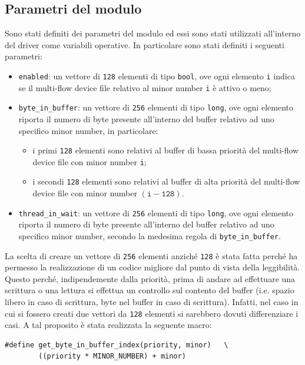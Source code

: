 \documentclass[oneside]{article}
\begin{document}
\subsection{Parametri del modulo}
Sono stati definiti dei parametri del modulo ed essi sono stati utilizzati all'interno del driver come variabili operative. In particolare sono stati definiti i seguenti parametri:
\begin{itemize}
\item \texttt{enabled}: un vettore di \texttt{128} elementi di tipo \texttt{bool}, ove ogni elemento \texttt{i} indica se il multi-flow device file relativo al minor number \texttt{i} è attivo o meno;
\item \texttt{byte\_in\_buffer}: un vettore di \texttt{256} elementi di tipo \texttt{long}, ove ogni elemento riporta il numero di byte presente all'interno del buffer relativo ad uno specifico minor number, in particolare:
\begin{itemize}
\item i primi \texttt{128} elementi sono relativi al buffer di bassa priorità del multi-flow device file con minor number \texttt{i};
\item i secondi \texttt{128} elementi sono relativi al buffer di alta priorità del multi-flow device file con minor number $(\mathtt{i-128})$.
\end{itemize}
\item \texttt{thread\_in\_wait}: un vettore di \texttt{256} elementi di tipo \texttt{long}, ove ogni elemento riporta il numero di byte presente all'interno del buffer relativo ad uno specifico minor number, secondo la medesima regola di \texttt{byte\_in\_buffer}.
\end{itemize}

La scelta di creare un vettore di \texttt{256} elementi anziché \texttt{128} è stata fatta perché ha permesso la realizzazione di un codice migliore dal punto di vista della leggibilità. Questo perché, indipendemente dalla priorità, prima di andare ad effettuare una scrittura o una lettura si effettua un controllo sul contento del buffer (i.e. spazio libero in caso di scrittura, byte nel buffer in caso di scrittura). Infatti, nel caso in cui si fossero creati due vettori da \texttt{128} elementi si sarebbero dovuti differenziare i casi. A tal proposito è stata realizzata la seguente macro:
\begin{lstlisting}
#define get_byte_in_buffer_index(priority, minor)	\
        ((priority * MINOR_NUMBER) + minor)
\end{lstlisting}
\end{document}

